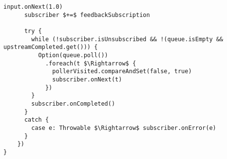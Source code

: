 \begin{lstlisting}[style=ScalaStyle, caption={Implementation of \code{RequestableObservable}}]
      input.onNext(1.0)
      subscriber $+=$ feedbackSubscription

      try {
        while (!subscriber.isUnsubscribed && !(queue.isEmpty && upstreamCompleted.get())) {
          Option(queue.poll())
            .foreach(t $\Rightarrow$ {
              pollerVisited.compareAndSet(false, true)
              subscriber.onNext(t)
            })
        }
        subscriber.onCompleted()
      }
      catch {
        case e: Throwable $\Rightarrow$ subscriber.onError(e)
      }
    })
}
\end{lstlisting}
